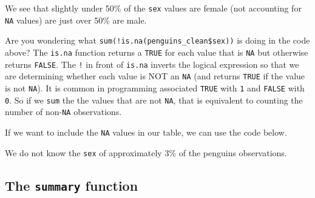 \documentclass[
]{book}
\newenvironment{Shaded}{\begin{snugshade}}{\end{snugshade}}
\newcommand{\AttributeTok}[1]{\textcolor[rgb]{0.77,0.63,0.00}{#1}}
\newcommand{\CommentTok}[1]{\textcolor[rgb]{0.56,0.35,0.01}{\textit{#1}}}
\newcommand{\DocumentationTok}[1]{\textcolor[rgb]{0.56,0.35,0.01}{\textbf{\textit{#1}}}}
\newcommand{\FunctionTok}[1]{\textcolor[rgb]{0.00,0.00,0.00}{#1}}
\newcommand{\NormalTok}[1]{#1}
\newcommand{\SpecialCharTok}[1]{\textcolor[rgb]{0.00,0.00,0.00}{#1}}
\newcommand{\StringTok}[1]{\textcolor[rgb]{0.31,0.60,0.02}{#1}}
\theoremstyle{definition}
\theoremstyle{definition}
\theoremstyle{definition}
\theoremstyle{definition}
\theoremstyle{remark}
\begin{document}
\begin{Shaded}
\end{Shaded}

We see that slightly under 50\% of the \texttt{sex} values are female (not accounting for \texttt{NA} values) are just over 50\% are male.

Are you wondering what \texttt{sum(!is.na(penguins\_clean\$sex))} is doing in the code above? The \texttt{is.na} function returns a \texttt{TRUE} for each value that is \texttt{NA} but otherwise returns \texttt{FALSE}. The \texttt{!} in front of \texttt{is.na} inverts the logical expression so that we are determining whether each value is NOT an \texttt{NA} (and returns \texttt{TRUE} if the value is not \texttt{NA}). It is common in programming associated \texttt{TRUE} with \texttt{1} and \texttt{FALSE} with \texttt{0}. So if we \texttt{sum} the the values that are not \texttt{NA}, that is equivalent to counting the number of non-\texttt{NA} observations.

If we want to include the \texttt{NA} values in our table, we can use the code below.

\begin{Shaded}
\end{Shaded}

We do not know the \texttt{sex} of approximately 3\% of the penguins observations.

\hypertarget{the-summary-function}{%
\subsection{\texorpdfstring{The \texttt{summary} function}{The summary function}}\label{the-summary-function}}
\end{document}
